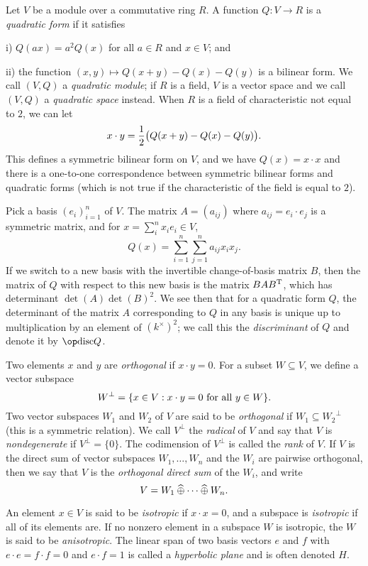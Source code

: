\bigskip

\noindent
Let $V$ be a module over a commutative ring $R$. A function $Q:V\to R$ is a {\it quadratic form} if
it satisfies
\medskip
\item{i)} $Q(ax) = a^2Q(x)$ for all $a\in R$ and $x\in V$; and
\smallskip
\item{ii)} the function $(x,y)\mapsto Q(x+y)-Q(x)-Q(y)$ is a bilinear form.
\medskip
We call $(V,Q)$ a {\it quadratic module}; if $R$ is a field, $V$ is a vector space and we call
$(V,Q)$ a {\it quadratic space} instead. When
$R$ is a field of characteristic not equal to $2$, we can let
$$x\cdot y = {1\over 2}\bigl(Q(x+y)-Q(x)-Q(y)\bigr).$$
This defines a symmetric bilinear form on $V$, and we have $Q(x) = x\cdot x$ and there is a one-to-one
correspondence between symmetric bilinear forms and quadratic forms (which is not true if the characteristic
of the field is equal to $2$).

Pick a basis $(e_i)_{i=1}^n$ of $V$. The matrix $A = (a_{ij})$ where $a_{ij} = e_i\cdot e_j$ is a symmetric
matrix, and for $x = \sum_i^n x_i e_i \in V$,
$$Q(x) = \sum_{i=1}^n \sum_{j=1}^n a_{ij} x_i x_j.$$
If we switch to a new basis with the invertible change-of-basis matrix $B$, then the matrix of $Q$
with respect to this new basis is the matrix $B A B^{\rm T}$, which has determinant $\det(A)\det(B)^2$.
We see then that for a quadratic form $Q$, the determinant of the matrix $A$ corresponding to $Q$ in
any basis is unique up to multiplication by an element of $(k^\times)^2$;
we call this the {\it discriminant} of $Q$ and denote it by $\disc Q$.

Two elements $x$ and $y$ are {\it orthogonal} if $x\cdot y = 0$. For a subset $W\subseteq V$, we define
a vector subspace
$$W^\perp = \{ x\in V : x\cdot y = 0\ \hbox{for all}\ y\in W\}.$$
Two vector subspaces $W_1$ and $W_2$ of $V$ are said to be {\it orthogonal} if $W_1\subseteq {W_2}^\perp$
(this is a symmetric relation).
We call $V^\perp$ the {\it radical} of $V$ and say that $V$ is {\it nondegenerate} if $V^\perp = \{0\}$.
The codimension of $V^\perp$ is called the {\it rank} of $V$.
If $V$ is the direct sum of vector subspaces $W_1, \ldots, W_n$ and the $W_i$ are pairwise orthogonal,
then we say that $V$ is the {\it orthogonal direct sum} of the $W_i$, and write
$$V = W_1\mathbin{\widehat\oplus} \cdots \mathbin{\widehat\oplus} W_n.$$

An element $x\in V$ is said to be {\it isotropic} if $x\cdot x = 0$, and a subspace is {\it isotropic}
if all of its elements are.
If no nonzero element in a subspace $W$ is isotropic, the $W$ is said to be
{\it anisotropic}. The linear span of two basis vectors $e$ and $f$
with $e\cdot e = f\cdot f = 0$ and $e\cdot f = 1$ is called a {\it hyperbolic plane} and is often denoted
$H$.

